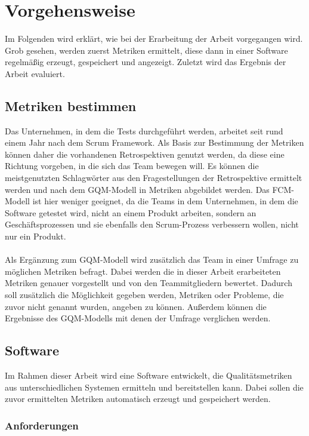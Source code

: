 \chapter{Vorgehensweise}

Im Folgenden wird erklärt, wie bei der Erarbeitung der Arbeit vorgegangen wird.
Grob gesehen, werden zuerst Metriken ermittelt, diese dann in einer Software regelmäßig erzeugt, gespeichert und angezeigt.
Zuletzt wird das Ergebnis der Arbeit evaluiert.

\section{Metriken bestimmen}

Das Unternehmen, in dem die Tests durchgeführt werden, arbeitet seit rund einem Jahr nach dem Scrum Framework.
Als Basis zur Bestimmung der Metriken können daher die vorhandenen Retrospektiven genutzt werden, da diese eine Richtung vorgeben, in die sich das Team bewegen will.
Es können die meistgenutzten Schlagwörter aus den Fragestellungen der Retrospektive ermittelt werden und nach dem \ac{GQM}-Modell in Metriken abgebildet werden.
Das \ac{FCM}-Modell ist hier weniger geeignet, da die Teams in dem Unternehmen, in dem die Software getestet wird, nicht an einem Produkt arbeiten, sondern an Geschäftsprozessen und sie ebenfalls den Scrum-Prozess verbessern wollen, nicht nur ein Produkt.
\\
\\
Als Ergänzung zum \ac{GQM}-Modell wird zusätzlich das Team in einer Umfrage zu möglichen Metriken befragt.
Dabei werden die in dieser Arbeit erarbeiteten Metriken genauer vorgestellt und von den Teammitgliedern bewertet.
Dadurch soll zusätzlich die Möglichkeit gegeben werden, Metriken oder Probleme, die zuvor nicht genannt wurden, angeben zu können.
Außerdem können die Ergebnisse des \ac{GQM}-Modells mit denen der Umfrage verglichen werden.

\clearpage
\section{Software}

Im Rahmen dieser Arbeit wird eine Software entwickelt, die Qualitätsmetriken aus unterschiedlichen Systemen ermitteln und bereitstellen kann.
Dabei sollen die zuvor ermittelten Metriken automatisch erzeugt und gespeichert werden.

\subsection{Anforderungen}\label{vorgehen:software}

